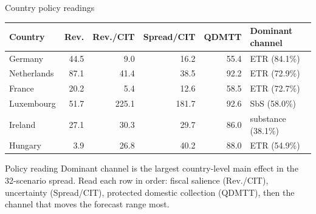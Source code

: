 \documentclass[aspectratio=169, 11pt]{beamer}
\begin{document}
\begin{frame}{Country policy readings}
\small
\begin{center}
\scriptsize
\setlength{\tabcolsep}{3pt}
\begin{tabular}{@{}L{1.65cm}r r r r L{2.6cm}@{}}
  \toprule
  Country & Rev. & Rev./CIT & Spread/CIT & QDMTT & Dominant channel \\
  \midrule
  Germany & 44.5 & 9.0 & 16.2 & 55.4 & ETR (84.1\%) \\
  Netherlands & 87.1 & 41.4 & 38.5 & 92.2 & ETR (72.9\%) \\
  France & 20.2 & 5.4 & 12.6 & 58.5 & ETR (72.7\%) \\
  Luxembourg & 51.7 & 225.1 & 181.7 & 92.6 & SbS (58.0\%) \\
  Ireland & 27.1 & 30.3 & 29.7 & 86.0 & substance (38.1\%) \\
  Hungary & 3.9 & 26.8 & 40.2 & 88.0 & ETR (54.9\%) \\
  \bottomrule
\end{tabular}
\end{center}

\vspace{0.3em}
\begin{alertblock}{Policy reading}
  Dominant channel is the largest country-level main effect in the 32-scenario spread. Read each row in order: fiscal salience (Rev./CIT), uncertainty (Spread/CIT), protected domestic collection (QDMTT), then the channel that moves the forecast range most.
\end{alertblock}
\end{frame}
\end{document}
